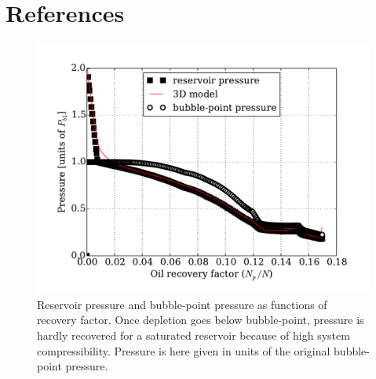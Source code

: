 \documentclass[final,authoryear,5p,twocolumn,10pt]{elsarticle}
\begin{document}
\section*{References}


\cite{*}


\pagebreak

\begin{figure}
\centering
\includegraphics[width=\linewidth]{./python/matbal_p}
\caption{Reservoir pressure and bubble-point pressure as functions of recovery factor. Once depletion goes below bubble-point, pressure is hardly recovered for a saturated reservoir because of high system compressibility. Pressure is here given in units of the original bubble-point pressure.}
\label{fig: matbal_p}
\end{figure}
\end{document}
